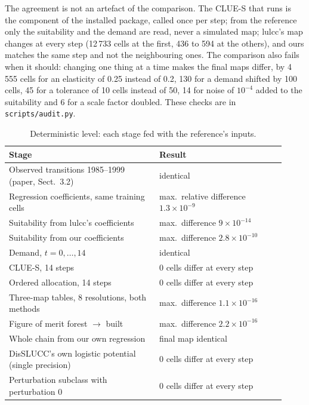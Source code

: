 The agreement is not an artefact of the comparison. The CLUE-S that runs is the
component of the installed package, called once per step; from the reference only the
suitability and the demand are read, never a simulated map; lulcc's map changes at every
step (12\,733 cells at the first, 436 to 594 at the others), and ours matches the same
step and not the neighbouring ones. The comparison also fails when it should: changing
one thing at a time makes the final maps differ, by 4\,555 cells for an elasticity of
0.25 instead of 0.2, 130 for a demand shifted by 100 cells, 45 for a tolerance of 10
cells instead of 50, 14 for noise of $10^{-4}$ added to the suitability and 6 for a
scale factor doubled. These checks are in \texttt{scripts/audit.py}.

\begin{table}[h]
\footnotesize
\begin{tabular}{p{0.5\linewidth}p{0.42\linewidth}}
\toprule
Stage & Result \\
\midrule
Observed transitions 1985--1999 (paper, Sect.~3.2) & identical \\
Regression coefficients, same training cells & max.\ relative difference $1.3 \times 10^{-9}$ \\
Suitability from lulcc's coefficients & max.\ difference $9 \times 10^{-14}$ \\
Suitability from our coefficients & max.\ difference $2.8 \times 10^{-10}$ \\
Demand, $t = 0, \dots, 14$ & identical \\
CLUE-S, 14 steps & 0 cells differ at every step \\
Ordered allocation, 14 steps & 0 cells differ at every step \\
Three-map tables, 8 resolutions, both methods & max.\ difference $1.1 \times 10^{-16}$ \\
Figure of merit forest $\to$ built & max.\ difference $2.2 \times 10^{-16}$ \\
Whole chain from our own regression & final map identical \\
DisSLUCC's own logistic potential (single precision) & 0 cells differ at every step \\
Perturbation subclass with perturbation 0 & 0 cells differ at every step \\
\bottomrule
\end{tabular}
\caption{Deterministic level: each stage fed with the reference's inputs.}
\label{tab:deterministic}
\end{table}

